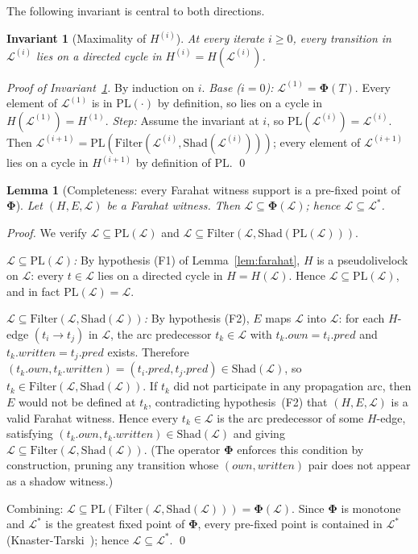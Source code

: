 \documentclass{article}
\newtheorem{lemma}[theorem]{Lemma}
\newtheorem{invariant}{Invariant}
\newcommand{\Ls}{\mathcal{L}^{*}}
\newcommand{\Li}[1]{\mathcal{L}^{(#1)}}   %
\newcommand{\Hi}[1]{H^{(#1)}}             %
\newcommand{\PL}{\mathrm{PL}}
\newcommand{\Shad}{\mathrm{Shad}}
\newcommand{\Filter}{\mathrm{Filter}}
\newcommand{\bPhi}{\boldsymbol{\Phi}}
\newcommand{\own}{\mathit{own}}
\newcommand{\writ}{\mathit{written}}
\newcommand{\pred}{\mathit{pred}}
\begin{document}
The following invariant is central to both directions.

\begin{invariant}[Maximality of $\Hi{i}$]
\label{inv:max}
At every iterate $i\geq 0$, every transition in $\Li{i}$ lies on a
directed cycle in $\Hi{i}=H(\Li{i})$.
\end{invariant}

\begin{proof}[Proof of Invariant~\ref{inv:max}]
By induction on $i$.
\emph{Base ($i=0$):} $\Li{1}=\bPhi(T)$.
Every element of $\Li{1}$ is in $\PL(\cdot)$ by definition, so lies on
a cycle in $H(\Li{1})=\Hi{1}$.
\emph{Step:} Assume the invariant at $i$, so $\PL(\Li{i})=\Li{i}$.
Then $\Li{i+1}=\PL(\Filter(\Li{i},\Shad(\Li{i})))$; every element of
$\Li{i+1}$ lies on a cycle in $\Hi{i+1}$ by definition of $\PL$. \qed
\end{proof}

\begin{lemma}[Completeness: every Farahat witness support is a pre-fixed point of $\bPhi$]
\label{lem:prefixed}
Let $(H,E,\mathcal{L})$ be a Farahat witness.  Then
$\mathcal{L}\subseteq\bPhi(\mathcal{L})$; hence $\mathcal{L}\subseteq\Ls$.
\end{lemma}

\begin{proof}
We verify $\mathcal{L}\subseteq\PL(\mathcal{L})$ and
$\mathcal{L}\subseteq\Filter(\mathcal{L},\Shad(\PL(\mathcal{L})))$.

\emph{$\mathcal{L}\subseteq\PL(\mathcal{L})$:}
By hypothesis (F1) of Lemma~\ref{lem:farahat}, $H$ is a pseudolivelock
on $\mathcal{L}$: every $t\in\mathcal{L}$ lies on a directed cycle in
$H=H(\mathcal{L})$.  Hence $\mathcal{L}\subseteq\PL(\mathcal{L})$, and
in fact $\PL(\mathcal{L})=\mathcal{L}$.

\emph{$\mathcal{L}\subseteq\Filter(\mathcal{L},\Shad(\mathcal{L}))$:}
By hypothesis (F2), $E$ maps $\mathcal{L}$ into $\mathcal{L}$: for each
$H$-edge $(t_i\!\to\!t_j)$ in $\mathcal{L}$, the arc predecessor
$t_k\in\mathcal{L}$ with $t_k.\own=t_i.\pred$ and $t_k.\writ=t_j.\pred$
exists.  Therefore $(t_k.\own,t_k.\writ)=(t_i.\pred,t_j.\pred)\in\Shad(\mathcal{L})$,
so $t_k\in\Filter(\mathcal{L},\Shad(\mathcal{L}))$.  If $t_k$
did not participate in any propagation arc, then $E$ would not be
defined at $t_k$, contradicting hypothesis~(F2) that $(H,E,\mathcal{L})$
is a valid Farahat witness.  Hence every $t_k\in\mathcal{L}$ is the arc
predecessor of some $H$-edge, satisfying
$(t_k.\own,t_k.\writ)\in\Shad(\mathcal{L})$ and giving
$\mathcal{L}\subseteq\Filter(\mathcal{L},\Shad(\mathcal{L}))$.
(The operator $\bPhi$ enforces this condition by construction, pruning any
transition whose $(\own,\writ)$ pair does not appear as a shadow
witness.)

Combining: $\mathcal{L}\subseteq\PL(\Filter(\mathcal{L},\Shad(\mathcal{L})))
=\bPhi(\mathcal{L})$.  Since $\bPhi$ is monotone and $\Ls$ is the
greatest fixed point of $\bPhi$, every pre-fixed point is contained in
$\Ls$ (Knaster-Tarski~\citep{tarski1955}); hence $\mathcal{L}\subseteq\Ls$. \qed
\end{proof}
\end{document}
